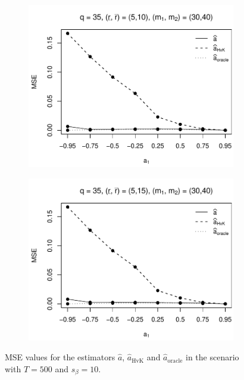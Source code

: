 \begin{figure}[p]
\begin{subfigure}[b]{0.45\textwidth}
\includegraphics[width=\textwidth]{Plots/Plots_Supplement/MSE_a_T=500_slope=10_(L1,L2,K1,K2,M1,M2)=(35,35,5,10,30,40).pdf}
\end{subfigure}
\hspace{0.25cm}
\begin{subfigure}[b]{0.45\textwidth}
\includegraphics[width=\textwidth]{Plots/Plots_Supplement/MSE_a_T=500_slope=10_(L1,L2,K1,K2,M1,M2)=(35,35,5,15,30,40).pdf}
\end{subfigure}
\caption{MSE values for the estimators $\widehat{a}$, $\widehat{a}_{\text{HvK}}$ and $\widehat{a}_{\text{oracle}}$ in the scenario with $T=500$ and $s_\beta=10$.}\label{fig:MSE_slope10_AR_robust} 
\end{figure}


